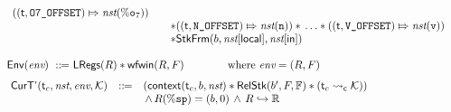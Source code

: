 \begin{figure}[!t]
\[\begin{array}{l}
\begin{array}{lll}
                (\relmsto{(\thrdid, \ofsOEig)}{\nst(\oreg{7})}) \\
                & & 
                \sepstar 
                (\relmsto{(\thrdid, \ofsN)}{\nst(\regn)}) \sepstar \, \dots 
                \sepstar (\relmsto{(\thrdid, \ofsV)}{\nst(\regv)}) \\
                & & 
                \sepstar \RelStkFm{\block}{\nst[\localRN]}{\nst[\inRN]}
            \end{array}
            \\
            \\
            \Env{\env} \ \define \ 
                \LRegs{\RFile} \sepstar 
                \wfwin{\RFile}{\Wstack} \qquad \qquad 
                \text{where} \ \env = (\RFile, \Wstack)
                \\
            \\[-5pt]
            \hspace*{-0.15em}
            \begin{array}{lll}
                \RelCurTAux{\thrdid_c}{\nst}{\env}{\hthrdlocalst} & \define &
                (\relcontext{\thrdid_c}{\block}{\nst} \sepstar 
                \RelStk{\block'}{\Wstack}{\hWstk} \sepstar (\astCurCont{\thrdid_c}{\hthrdlocalst})) \\
                & & \, \land \,  \RFile(\spreg) = (\block, 0) \, \land \, 
                \Rinj{\RFile}{\hRfile}

\end{array}
\end{array}\]
\end{figure}
